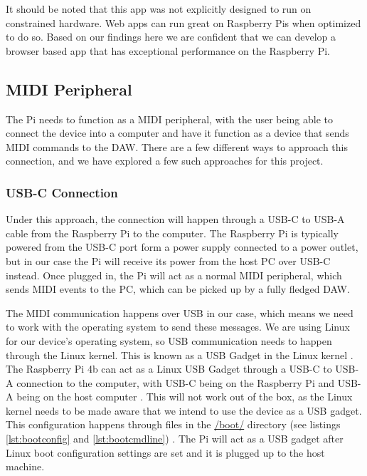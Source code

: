 It should be noted that this app was not explicitly designed to run on constrained
hardware. Web apps can run great on Raspberry Pis when optimized to do so. Based on our
findings here we are confident that we can develop a browser based app that has
exceptional performance on the Raspberry Pi.

\subsection{MIDI Peripheral}
\label{sec:midi_peripheral}

The Pi needs to function as a MIDI peripheral, with the user being able to connect the
device into a computer and have it function as a device that sends MIDI commands to the
DAW. There are a few different ways to approach this connection, and we have explored a
few such approaches for this project.


\subsubsection{USB-C Connection}

Under this approach, the connection will happen through a USB-C to USB-A cable from the
Raspberry Pi to the computer. The Raspberry Pi is typically powered from the USB-C port
form a power supply connected to a power outlet, but in our case the Pi will receive its
power from the host PC over USB-C instead. Once plugged in, the Pi will act as a normal
MIDI peripheral, which sends MIDI events to the PC, which can be picked up by a fully
fledged DAW.

The MIDI communication happens over USB in our case, which means we need to work with the
operating system to send these messages. We are using Linux for our device's operating
system, so USB communication needs to happen through the Linux kernel. This is known as a
USB Gadget in the Linux kernel \autocite{usbGadgetDocumentation}. The Raspberry Pi 4b can
act as a Linux USB Gadget through a USB-C to USB-A connection to the computer, with USB-C
being on the Raspberry Pi and USB-A being on the host computer
\autocite{raspberryPiGadgetSetup}. This will not work out of the box, as the Linux kernel
needs to be made aware that we intend to use the device as a USB gadget. This
configuration happens through files in the \url{/boot/} directory
(see listings \ref{lst:bootconfig} and
\ref{lst:bootcmdline}) \autocite{raspberryPiGadgetSetup}. The Pi will act as a USB
gadget after Linux boot configuration settings are set and it is plugged up to the host
machine.

